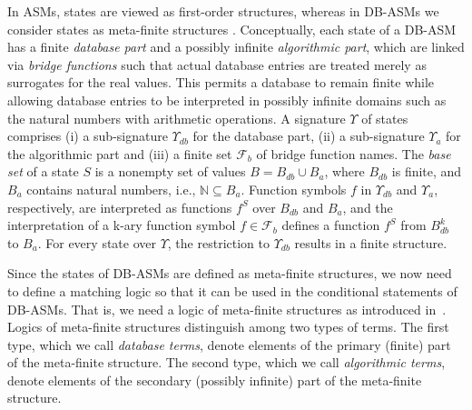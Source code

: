 \documentclass[preprint,11pt]{elsarticle}
\theoremstyle{definition}
\theoremstyle{remark}
\begin{document}
In ASMs, states are viewed as first-order structures, whereas in DB-ASMs we consider states as meta-finite structures
\cite{schewe:Axiomatization}. Conceptually, each state of a DB-ASM has a finite
\emph{database part} and a possibly infinite \emph{algorithmic part}, which are
linked via \emph{bridge functions} such that actual database entries
are treated merely as surrogates for the real values. This permits
a database to remain finite while allowing database entries to be
interpreted in possibly infinite domains such as the natural numbers
with arithmetic operations. A signature $\Upsilon$ of states
comprises (i) a sub-signature $\Upsilon_{db}$ for the database part, (ii) a
sub-signature $\Upsilon_a$ for the algorithmic part and (iii) a finite set
$\mathcal{F}_b$ of bridge function names. The \emph{base set} of a
state $S$ is a nonempty set of values $B=B_{db}\cup B_{a}$, where
$B_{db}$ is finite, and $B_a$ contains natural numbers, i.e., $\mathbb{N}\subseteq B_a$. Function
symbols $f$ in $\Upsilon_{db}$ and $\Upsilon_{a}$, respectively, are
interpreted as functions $f^S$ over $B_{db}$ and $B_{a}$, and the
 interpretation of a k-ary function symbol $f\in\mathcal{F}_b$
defines a function $f^S$ from $B^{k}_{db}$ to $B_a$. For every state
over $\Upsilon$, the restriction to $\Upsilon_{db}$ results in a
finite structure.


Since the states of DB-ASMs are defined as meta-finite structures, we now need to define a matching logic so that it can be used in the conditional statements of DB-ASMs. That is, we need a  logic of meta-finite structures as introduced in~\cite{graedel:infcomp1998}. Logics of meta-finite structures distinguish among two types of terms. The first type, which we call \emph{database terms}, denote elements of the primary (finite) part of the meta-finite structure. The second type, which we call \emph{algorithmic terms}, denote elements of the secondary (possibly infinite) part of the meta-finite structure. 
\end{document}
